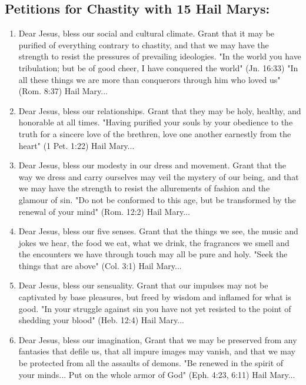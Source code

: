 \documentclass{article}
\begin{document}
\begin{multicols}{2}
\subsection*{Petitions for Chastity with 15 Hail Marys:}

\begin{enumerate}
\item Dear Jesus, bless our social and cultural climate. Grant that it may be purified of everything contrary to chastity, and that we may have the strength to resist the pressures of prevailing ideologies. "In the world you have tribulation; but be of good cheer, I have conquered the world" (Jn. 16:33) "In all these things we are more than conquerors through him who loved us" (Rom. 8:37) Hail Mary...

\item Dear Jesus, bless our relationships. Grant that they may be holy, healthy, and honorable at all times. "Having purified your souls by your obedience to the truth for a sincere love of the brethren, love one another earnestly from the heart" (1 Pet. 1:22) Hail Mary...

\item Dear Jesus, bless our modesty in our dress and movement. Grant that the way we dress and carry ourselves may veil the mystery of our being, and that we may have the strength to resist the allurements of fashion and the glamour of sin. "Do not be conformed to this age, but be transformed by the renewal of your mind" (Rom. 12:2) Hail Mary...

\item Dear Jesus, bless our five senses. Grant that the things we see, the music and jokes we hear, the food we eat, what we drink, the fragrances we smell and the encounters we have through touch may all be pure and holy. "Seek the things that are above" (Col. 3:1) Hail Mary...

\item Dear Jesus, bless our sensuality. Grant that our impulses may not be captivated by base pleasures, but freed by wisdom and inflamed for what is good. "In your struggle against sin you have not yet resisted to the point of shedding your blood" (Heb. 12:4) Hail Mary...

\item Dear Jesus, bless our imagination, Grant that we may be preserved from any fantasies that defile us, that all impure images may vanish, and that we may be protected from all the assaults of demons. "Be renewed in the spirit of your minds... Put on the whole armor of God" (Eph. 4:23, 6:11) Hail Mary...


\end{enumerate}
\end{multicols}
\end{document}
